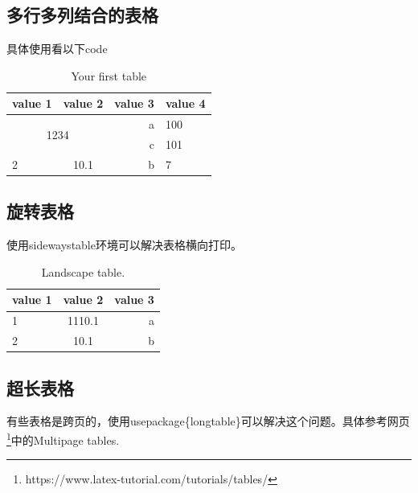 \subsection{多行多列结合的表格}
具体使用看以下code
\begin{table}[h!]
	\begin{center}
		\caption{Your first table} %
		\label{tab:table4}
		\begin{tabular}{l|c|r|l}
			\toprule
			\textbf{value 1} & \textbf{value 2} & \textbf{value 3} & \textbf{value 4}\\
			\hline
			\multicolumn{2}{c|}{\multirow{2}{*}{1234}} & a & 100 \\
			\multicolumn{2}{c|}{} &c & 101\\
			\hline
			2 & 10.1   & b  & 7\\
			\bottomrule %
		\end{tabular}
	\end{center}
\end{table}

\subsection{旋转表格}  %
使用sidewaystable环境可以解决表格横向打印。
\begin{table}
	\begin{center}
		\caption{Landscape table.} %
		\label{tab:table5}
		\begin{tabular}{l|c|r}
			\toprule
			\textbf{value 1} & \textbf{value 2} & \textbf{value 3}\\
			\midrule
			1 & 1110.1 & a  \\
			\hline
			2 & 10.1    & b  \\
			\bottomrule
		\end{tabular}
	\end{center}
\end{table}
\subsection{超长表格}
有些表格是跨页的，使用usepackage\{longtable\}可以解决这个问题。具体参考网页\footnote{\label{multipage_table}https://www.latex-tutorial.com/tutorials/tables/}中的Multipage tables.